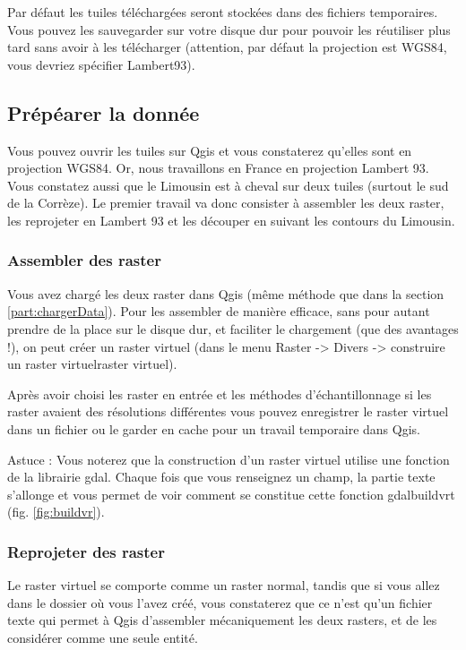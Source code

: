 \documentclass[a4paper, 11pt]{article}
\begin{document}
  Par défaut les tuiles téléchargées seront stockées dans des fichiers temporaires. Vous pouvez les sauvegarder sur votre disque dur pour pouvoir les réutiliser plus tard sans avoir à les télécharger (attention, par défaut la projection est WGS84, vous devriez spécifier Lambert93).

  \subsection{Prépéarer la donnée}

  Vous pouvez ouvrir les tuiles sur Qgis et vous constaterez qu'elles sont en projection WGS84. Or, nous travaillons en France en projection Lambert 93. Vous constatez aussi que le Limousin est à cheval sur deux tuiles (surtout le sud de la Corrèze). Le premier travail va donc consister à assembler les deux raster, les reprojeter en Lambert 93 et les découper en suivant les contours du Limousin.

    \subsubsection{Assembler des raster}

    Vous avez chargé les deux raster dans Qgis (même méthode que dans la section \ref{part:chargerData}). Pour les assembler de manière efficace, sans pour autant prendre de la place sur le disque dur, et faciliter le chargement (que des avantages !), on peut créer un raster virtuel (dans le menu Raster -> Divers -> construire un raster virtuelraster virtuel).

    Après avoir choisi les raster en entrée et les méthodes d'échantillonnage si les raster avaient des résolutions différentes vous pouvez enregistrer le raster virtuel dans un fichier ou le garder en cache pour un travail temporaire dans Qgis.

    Astuce : Vous noterez que la construction d'un raster virtuel utilise une fonction de la librairie gdal. Chaque fois que vous renseignez un champ, la partie texte s'allonge et vous permet de voir comment se constitue cette fonction gdalbuildvrt (fig. \ref{fig:buildvr}).

    \subsubsection{Reprojeter des raster}

    Le raster virtuel se comporte comme un raster normal, tandis que si vous allez dans le dossier où vous l'avez créé, vous constaterez que ce n'est qu'un fichier texte qui permet à Qgis d'assembler mécaniquement les deux rasters, et de les considérer comme une seule entité.
\end{document}

